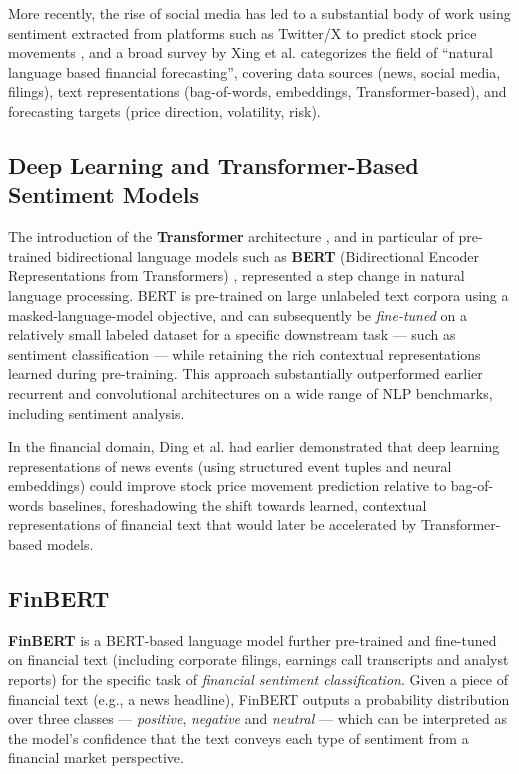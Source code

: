 More recently, the rise of social media has led to a substantial body of
work using sentiment extracted from platforms such as Twitter/X to predict
stock price movements \cite{pagolu2016}, and a broad survey by Xing et al.
\cite{xing2018} categorizes the field of ``natural language based
financial forecasting'', covering data sources (news, social media,
filings), text representations (bag-of-words, embeddings,
Transformer-based), and forecasting targets (price direction, volatility,
risk).

\subsection{Deep Learning and Transformer-Based Sentiment Models}
\label{sec:soa-deep-learning}

The introduction of the \textbf{Transformer} architecture
\cite{vaswani2017attention}, and in particular of pre-trained
bidirectional language models such as \textbf{BERT} (Bidirectional
Encoder Representations from Transformers) \cite{devlin2019bert},
represented a step change in natural language processing. BERT is
pre-trained on large unlabeled text corpora using a masked-language-model
objective, and can subsequently be \emph{fine-tuned} on a relatively small
labeled dataset for a specific downstream task --- such as sentiment
classification --- while retaining the rich contextual representations
learned during pre-training. This approach substantially outperformed
earlier recurrent and convolutional architectures on a wide range of NLP
benchmarks, including sentiment analysis.

In the financial domain, Ding et al. \cite{ding2015} had earlier
demonstrated that deep learning representations of news events (using
structured event tuples and neural embeddings) could improve stock price
movement prediction relative to bag-of-words baselines, foreshadowing the
shift towards learned, contextual representations of financial text that
would later be accelerated by Transformer-based models.

\subsection{FinBERT}
\label{sec:soa-finbert}

\textbf{FinBERT} \cite{finbert2019} is a BERT-based language model further
pre-trained and fine-tuned on financial text (including corporate
filings, earnings call transcripts and analyst reports) for the specific
task of \emph{financial sentiment classification}. Given a piece of
financial text (e.g., a news headline), FinBERT outputs a probability
distribution over three classes --- \emph{positive}, \emph{negative} and
\emph{neutral} --- which can be interpreted as the model's confidence that
the text conveys each type of sentiment from a financial market
perspective.

